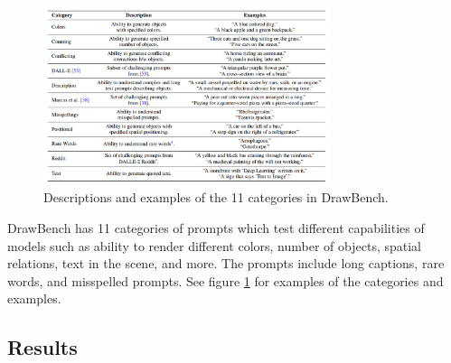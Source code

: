 \begin{figure}
    \centering
    \includegraphics[width=0.75\textwidth]{images/imagen/drawbench_categories.png}
    \caption{Descriptions and examples of the 11 categories in DrawBench.}
    \label{fig:imagen_drawbench_categories}
\end{figure}

DrawBench has 11 categories of prompts which test different capabilities of models such as ability to render different colors, number of objects, spatial relations, text in the scene, and more. The prompts include long captions, rare words, and misspelled prompts. See figure \ref{fig:imagen_drawbench_categories} for examples of the categories and examples.














\subsection{Results}

